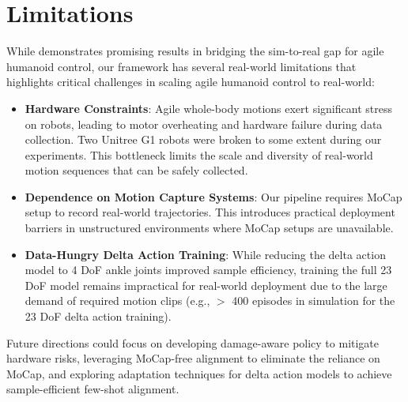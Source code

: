 \section{Limitations}
\label{sec:limitations}
While \method demonstrates promising results in bridging the sim-to-real gap for agile humanoid control, our framework has several real-world limitations that highlights critical challenges in scaling agile humanoid control to real-world:
\begin{itemize}
    \item \textbf{Hardware Constraints}: Agile whole-body motions exert significant stress on robots, leading to motor overheating and hardware failure during data collection. Two Unitree G1 robots were broken to some extent during our experiments. This bottleneck limits the scale and diversity of real-world motion sequences that can be safely collected.
    \item \textbf{Dependence on Motion Capture Systems}: Our pipeline requires MoCap setup to record real-world trajectories. This introduces practical deployment barriers in unstructured environments where MoCap setups are unavailable.
    \item \textbf{Data-Hungry Delta Action Training}: While reducing the delta action model to 4 DoF ankle joints improved sample efficiency, training the full 23 DoF model remains impractical for real-world deployment due to the large demand of required motion clips (e.g., $>$ 400 episodes in simulation for the 23 DoF delta action training).
\end{itemize}
Future directions could focus on developing damage-aware policy to mitigate hardware risks, leveraging MoCap-free alignment to eliminate the reliance on MoCap, and exploring adaptation techniques for delta action models to achieve sample-efficient few-shot alignment.